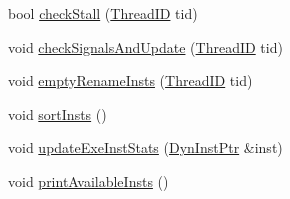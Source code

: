 \begin{DoxyCompactItemize}
bool \hyperlink{classDefaultIEW_a2dd2400250619a315cb46f95f777db01}{checkStall} (\hyperlink{base_2types_8hh_ab39b1a4f9dad884694c7a74ed69e6a6b}{ThreadID} tid)
\item 
void \hyperlink{classDefaultIEW_a4e0fecf6356ab23b6af3043c519b3f31}{checkSignalsAndUpdate} (\hyperlink{base_2types_8hh_ab39b1a4f9dad884694c7a74ed69e6a6b}{ThreadID} tid)
\item 
void \hyperlink{classDefaultIEW_a1fe94223811c326eed5cc0664d85c5fd}{emptyRenameInsts} (\hyperlink{base_2types_8hh_ab39b1a4f9dad884694c7a74ed69e6a6b}{ThreadID} tid)
\item 
void \hyperlink{classDefaultIEW_a9ff2aa32ab0f40674cb3518108d62f8e}{sortInsts} ()
\item 
void \hyperlink{classDefaultIEW_a132db67a5c42af856da64e347e8284d8}{updateExeInstStats} (\hyperlink{classDefaultIEW_a028ce10889c5f6450239d9e9a7347976}{DynInstPtr} \&inst)
\item 
void \hyperlink{classDefaultIEW_a8336a7a280f893bc1225d7b1ce234106}{printAvailableInsts} ()
\end{DoxyCompactItemize}
